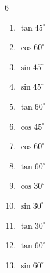 \begin{multicols}{6}
\begin{enumerate}
  \item $\displaystyle \tan{45^\circ}$

        \phantom{$\displaystyle =1$}

  \item $\displaystyle \cos{60^\circ}$


  \item $\displaystyle \sin{45^\circ}$


  \item $\displaystyle \sin{45^\circ}$


\columnbreak %

  \item $\displaystyle \tan{60^\circ}$


  \item $\displaystyle \cos{45^\circ}$


  \item $\displaystyle \cos{60^\circ}$


  \item $\displaystyle \tan{60^\circ}$


  \item $\displaystyle \cos{30^\circ}$


  \item $\displaystyle \sin{30^\circ}$


  \item $\displaystyle \tan{30^\circ}$


  \item $\displaystyle \tan{60^\circ}$


  \item $\displaystyle \sin{60^\circ}$


\end{enumerate}
\end{multicols}

